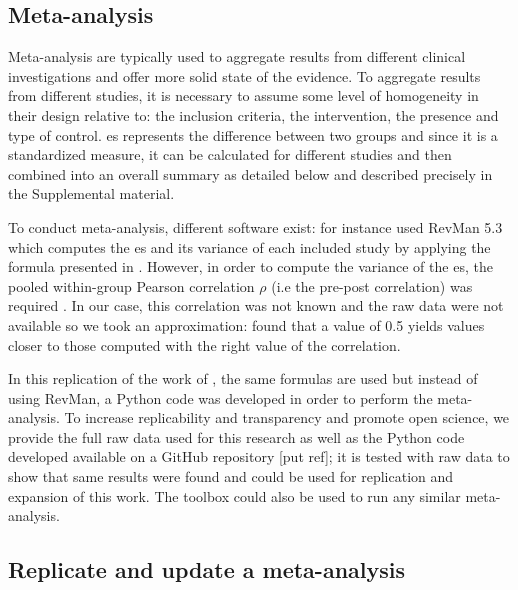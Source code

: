 \subsection{Meta-analysis}

 
Meta-analysis are typically used to aggregate results from different clinical investigations and offer more solid state of the evidence. To aggregate results from different studies, it is necessary to assume some level of homogeneity in their design relative to: the inclusion criteria, the intervention, the presence and type of control.  
\gls{es} represents the difference between two groups and since it is a standardized measure, it can be calculated for different 
studies and then combined into an overall summary as detailed below and described precisely in the Supplemental material.

To conduct meta-analysis, different software exist: for instance \citet{Cortese2016} used RevMan 5.3 \citep{RevMan} which computes the \gls{es} and its 
variance of each included study by applying the formula presented in \citet{Morris2008}. However, in order to compute the variance of the \gls{es}, 
the pooled within-group Pearson correlation $\rho$ (i.e the pre-post correlation) was required 
\citep{James2013}. In our case, this correlation was not known and the raw data were not available so we took an
 approximation: \citet{Balk2012} found that a value of 0.5 yields values closer to those computed with the right value of the correlation. 

In this replication of the work of \citeauthor{Cortese2016}, the same
formulas are used \citep{Borenstein2009} but instead of using RevMan, a Python code was developed in order to perform the meta-analysis. To increase 
replicability and transparency and promote open science, we provide the full raw data used for this research as well as the Python code 
developed available on a GitHub repository [put ref]; it is tested with \citet{Cortese2016} raw data to show that same results were found and could 
be used for replication and expansion of this work. The toolbox could also be used to run any similar meta-analysis.  
 
\subsection{Replicate and update a meta-analysis}

